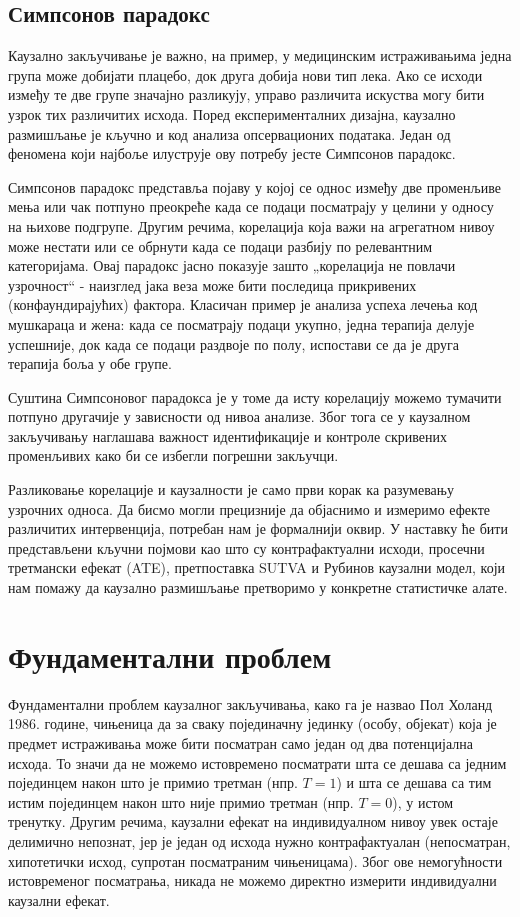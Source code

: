 \documentclass[12pt, a4paper]{article}
\begin{document}
\subsection{Симпсонов парадокс}
Каузално закључивање је важно, на пример, у медицинским истраживањима једна група може добијати плацебо, док друга добија нови тип лека.
Ако се исходи између те две групе значајно разликују, управо различита искуства могу бити узрок тих различитих исхода. Поред експерименталних дизајна, каузално размишљање је кључно и код анализа опсервационих података. Један од феномена који најбоље илуструје ову потребу јесте 
Симпсонов парадокс.

Симпсонов парадокс представља појаву у којој се однос између две променљиве мења или чак потпуно преокреће када се подаци 
посматрају у целини у односу на њихове подгрупе. Другим речима, корелација која важи на агрегатном нивоу може нестати или 
се обрнути када се подаци разбију по релевантним категоријама. Овај парадокс јасно показује зашто „корелација не повлачи узрочност“ - наизглед јака веза може бити последица прикривених 
(конфаундирајућих) фактора. %
Класичан пример је анализа успеха лечења код мушкараца и жена: када се посматрају подаци укупно, 
једна терапија делује успешније, док када се подаци раздвоје по полу, испостави се да је друга терапија боља у обе групе.

Суштина Симпсоновог парадокса је у томе да исту корелацију можемо тумачити потпуно другачије у зависности од нивоа анализе. 
Због тога се у каузалном закључивању наглашава важност идентификације и контроле скривених променљивих како би се избегли 
погрешни закључци.

Разликовање корелације и каузалности је само први корак ка разумевању узрочних односа. Да бисмо могли прецизније да објаснимо и измеримо ефекте различитих интервенција, 
потребан нам је формалнији оквир. У наставку ће бити представљени кључни појмови као што су контрафактуални исходи, просечни третмански ефекат (ATE), претпоставка 
SUTVA и Рубинов каузални модел, који нам помажу да каузално размишљање претворимо у конкретне статистичке алате.


\section{Фундаментални проблем}

Фундаментални проблем каузалног закључивања, како га је назвао Пол Холанд 1986. године, чињеница да за сваку појединачну јединку (особу, објекат) која је 
предмет истраживања може бити посматран само један од два потенцијална исхода. То значи да не можемо истовремено посматрати шта се дешава са једним појединцем након 
што је примио третман (нпр. $T=1$) и шта се дешава са тим истим појединцем након што није примио третман (нпр. $T=0$), у истом тренутку. Другим речима, каузални ефекат 
на индивидуалном нивоу увек остаје делимично непознат, јер је један од исхода нужно контрафактуалан (непосматран, хипотетички исход, супротан посматраним чињеницама).
Због ове немогућности истовременог посматрања, никада не можемо директно измерити индивидуални каузални ефекат.
\end{document}
